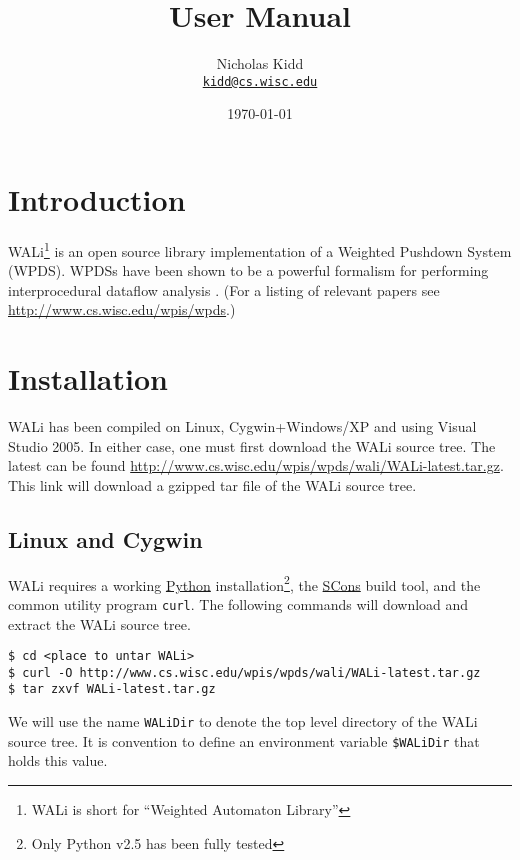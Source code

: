 \documentclass[english,a4paper,11pt]{article}
\title{\WALi User Manual}
\date{\today}
\author{ Nicholas Kidd \\ { \href{mailto:kidd@cs.wisc.edu}{\nolinkurl{kidd@cs.wisc.edu}}} }
\theoremstyle{definition}
\def\WALi{\textsf{WALi}\xspace}
\begin{document}
\maketitle

\section{Introduction}
\label{Se:Introduction}
\WALi\footnote{\WALi is short for ``Weighted Automaton Library''} is an open
source library implementation of a Weighted Pushdown System (WPDS). WPDSs have
been shown to be a powerful formalism for performing interprocedural dataflow
analysis \cite{SAS:RSJ:2003,SCP:RSJM:2005,FSTTCS:RLK:2007}. (For a listing of
relevant papers see \url{http://www.cs.wisc.edu/wpis/wpds}.)

\section{Installation}
\label{Se:Installation}
\WALi has been compiled on Linux, Cygwin+Windows/XP and using
Visual Studio 2005. In either case, one must first download the \WALi source
tree. The latest can be found
\href{http://www.cs.wisc.edu/wpis/wpds/wali/WALi-latest.tar.gz}{http://www.cs.wisc.edu/wpis/wpds/wali/WALi-latest.tar.gz}.
This link will download a gzipped tar file of the \WALi source tree.

\subsection{Linux and Cygwin}
\label{Se:Linux}
\WALi requires a working \href{http://www.python.org}{Python}
installation\footnote{Only Python v2.5 has been fully tested},
the \href{http://www.scons.org}{SCons} build tool, and the common utility
program \verb!curl!. The following commands will download and extract the \WALi
source tree.

\vspace{1em}
\noindent
\begin{cmdbox}
\begin{verbatim}
$ cd <place to untar WALi>
$ curl -O http://www.cs.wisc.edu/wpis/wpds/wali/WALi-latest.tar.gz 
$ tar zxvf WALi-latest.tar.gz
\end{verbatim}
\end{cmdbox}
\vspace{1em}

\noindent  We will use the name \verb!WALiDir! to denote the top level directory of the
\WALi source tree. It is convention to define an environment variable
\verb!$WALiDir! that holds this value.
\end{document}

